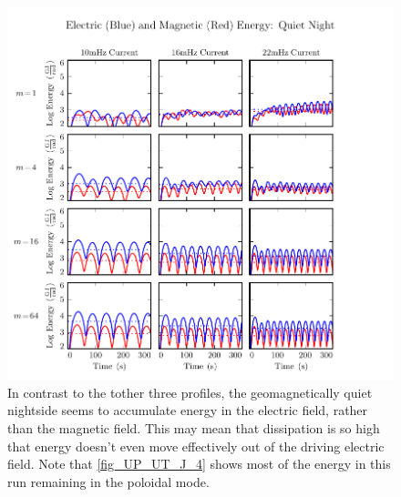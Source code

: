 \begin{figure}[H]
    \centering
    \includegraphics[width=\textwidth]{figures/UB_UE_J_4.pdf}
    \caption[Current-Driven Electric and Magnetic Energy: Quiet Night]{
      In contrast to the tother three profiles, the geomagnetically quiet nightside seems to accumulate energy in the electric field, rather than the magnetic field. This may mean that dissipation is so high that energy doesn't even move effectively out of the driving electric field. Note that \cref{fig_UP_UT_J_4} shows most of the energy in this run remaining in the poloidal mode. 
    }
    \label{fig_UB_UE_J_4}
\end{figure}










